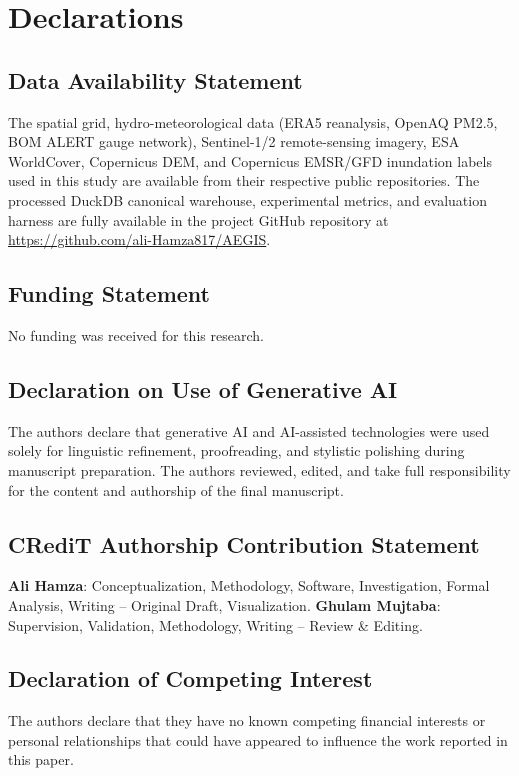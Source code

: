 \section*{Declarations}

\subsection*{Data Availability Statement}
The spatial grid, hydro-meteorological data (ERA5 reanalysis, OpenAQ PM2.5, BOM ALERT gauge network), Sentinel-1/2 remote-sensing imagery, ESA WorldCover, Copernicus DEM, and Copernicus EMSR/GFD inundation labels used in this study are available from their respective public repositories. The processed DuckDB canonical warehouse, experimental metrics, and evaluation harness are fully available in the project GitHub repository at \url{https://github.com/ali-Hamza817/AEGIS}.

\subsection*{Funding Statement}
No funding was received for this research.

\subsection*{Declaration on Use of Generative AI}
The authors declare that generative AI and AI-assisted technologies were used solely for linguistic refinement, proofreading, and stylistic polishing during manuscript preparation. The authors reviewed, edited, and take full responsibility for the content and authorship of the final manuscript.

\subsection*{CRediT Authorship Contribution Statement}
\textbf{Ali Hamza}: Conceptualization, Methodology, Software, Investigation, Formal Analysis, Writing -- Original Draft, Visualization. \textbf{Ghulam Mujtaba}: Supervision, Validation, Methodology, Writing -- Review \& Editing.

\subsection*{Declaration of Competing Interest}
The authors declare that they have no known competing financial interests or personal relationships that could have appeared to influence the work reported in this paper.
